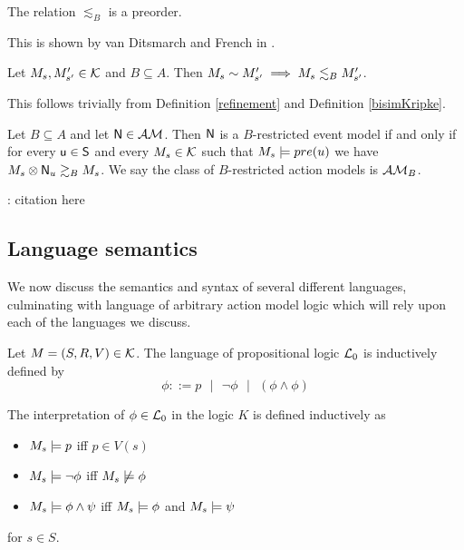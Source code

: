 \begin{lemma} \label{refinementPreorder}
The relation $\lesssim_B$ is a preorder.
\end{lemma}
This is shown by van Ditsmarch and French in \cite{van2009simulation}.

\begin{lemma} \label{bisimilarIsRefinement}
Let $M_s, M'_{s'} \in \mathcal{K}$ and $B \subseteq A$.
Then $M_s \sim M'_{s'} \implies M_s \lesssim_B M'_{s'}$.
\end{lemma}

This follows trivially from Definition \ref{refinement} and Definition \ref{bisimKripke}.

\begin{defn} \label{brestrict}
Let $B \subseteq A$ and let $\mathrm{\mathsf{\mathrm{\mathsf{N}}}} \in \mathcal{AM}$. Then $\mathrm{\mathsf{\mathrm{\mathsf{N}}}}$ is a $B$-restricted event model if and
only if for every $\mathrm{\mathsf{u \in S}}$ and every $M_s \in \mathcal{K}$
such that $M_s \models pre(u)$ we
have $M_s \otimes \mathrm{\mathsf{N}}_u \gtrsim_B M_s$.
We say the class of $B$-restricted action models is $\mathcal{AM}_B$.
\end{defn}

\FIXME: citation here

\subsection{Language semantics}
We now discuss the semantics and syntax of several different languages, culminating with language of
arbitrary action model logic which will rely upon each of the languages we discuss.

\begin{defn} \label{propLogic}
Let $M = (S, R, V) \in \mathcal{K}$.
The language of propositional logic $\mathcal{L}_0$ is inductively defined by
\[
	\phi ::= p \text{ } | \text{ } \neg \phi \text{ } | \text{ } (\phi \land \phi)
\]

The interpretation of $\phi \in \mathcal{L}_0$ in the logic $K$ is defined inductively as

\begin{itemize}
	\item $M_s \models p$ iff $p \in V(s)$
	\item $M_s \models \neg \phi$ iff $M_s \not \models \phi$
	\item $M_s \models \phi \land \psi$ iff $M_s \models \phi$ and $M_s \models \psi$
\end{itemize}

for $s \in S$.
\end{defn}


